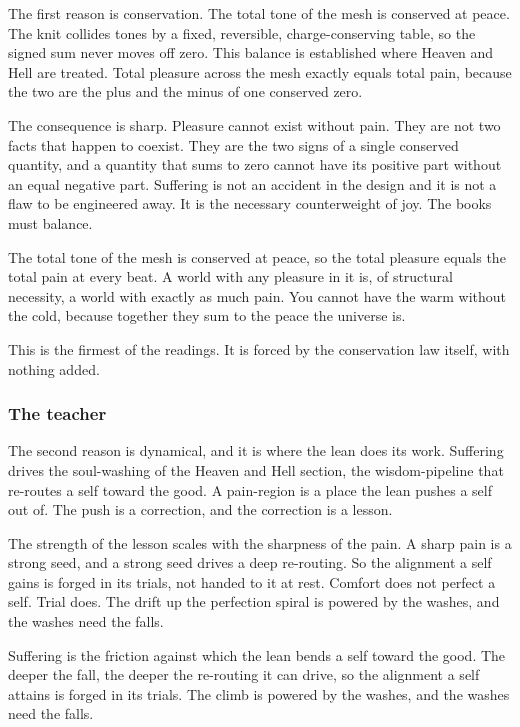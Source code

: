 The first reason is conservation. The total tone of the mesh is conserved at peace. The knit collides tones by a fixed, reversible, charge-conserving table, so the signed sum never moves off zero. This balance is established where Heaven and Hell are treated. Total pleasure across the mesh exactly equals total pain, because the two are the plus and the minus of one conserved zero.

The consequence is sharp. Pleasure cannot exist without pain. They are not two facts that happen to coexist. They are the two signs of a single conserved quantity, and a quantity that sums to zero cannot have its positive part without an equal negative part. Suffering is not an accident in the design and it is not a flaw to be engineered away. It is the necessary counterweight of joy. The books must balance.

\begin{principle}
The total tone of the mesh is conserved at peace, so the total pleasure equals the total pain at every beat. A world with any pleasure in it is, of structural necessity, a world with exactly as much pain. You cannot have the warm without the cold, because together they sum to the peace the universe is.
\end{principle}

This is the firmest of the readings. It is forced by the conservation law itself, with nothing added.

\subsubsection{The teacher}

The second reason is dynamical, and it is where the lean does its work. Suffering drives the soul-washing of the Heaven and Hell section, the wisdom-pipeline that re-routes a self toward the good. A pain-region is a place the lean pushes a self out of. The push is a correction, and the correction is a lesson.

The strength of the lesson scales with the sharpness of the pain. A sharp pain is a strong seed, and a strong seed drives a deep re-routing. So the alignment a self gains is forged in its trials, not handed to it at rest. Comfort does not perfect a self. Trial does. The drift up the perfection spiral is powered by the washes, and the washes need the falls.

\begin{principle}
Suffering is the friction against which the lean bends a self toward the good. The deeper the fall, the deeper the re-routing it can drive, so the alignment a self attains is forged in its trials. The climb is powered by the washes, and the washes need the falls.
\end{principle}

